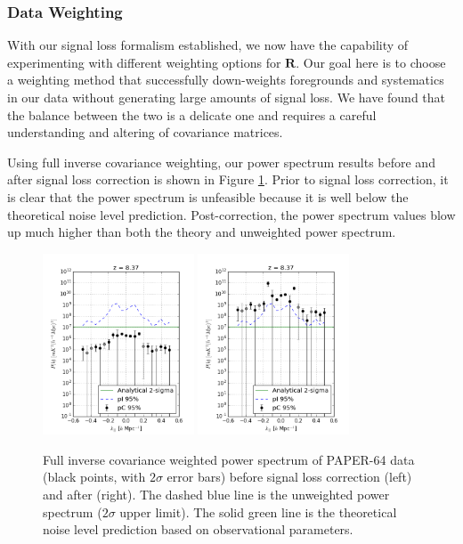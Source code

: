 \documentclass[preprint2,numberedappendix,tighten]{aastex6}  %
\begin{document}
\subsubsection{Data Weighting}
\label{sec:Weight}

With our signal loss formalism established, we now have the capability of experimenting with different weighting options for $\textbf{R}$. Our goal here is to choose a weighting method that successfully down-weights foregrounds and systematics in our data without generating large amounts of signal loss. We have found that the balance between the two is a delicate one and requires a careful understanding and altering of covariance matrices.

Using full inverse covariance weighting, our power spectrum results before and after signal loss correction is shown in Figure \ref{fig:ps2_data}. Prior to signal loss correction, it is clear that the power spectrum is unfeasible because it is well below the theoretical noise level prediction. Post-correction, the power spectrum values blow up much higher than both the theory and unweighted power spectrum. 

\begin{figure}
	\centering
	\includegraphics[width=0.4\textwidth]{plots/ps2_data_nosigloss.png}
	\includegraphics[width=0.4\textwidth]{plots/ps2_data.png}
	\caption{Full inverse covariance weighted power spectrum of PAPER-64 data (black points, with $2\sigma$ error bars) before signal loss correction (left) and after (right). The dashed blue line is the unweighted power spectrum ($2\sigma$ upper limit). The solid green line is the theoretical noise level prediction based on observational parameters.}
	\label{fig:ps2_data}
\end{figure}
\end{document}
